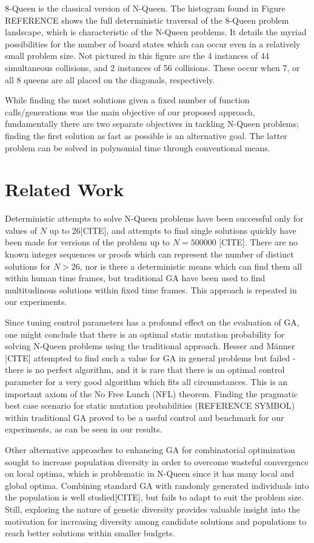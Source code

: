 \documentclass[conference]{IEEEtran}
\begin{document}
8-Queen is the classical version of N-Queen. The histogram found in Figure {REFERENCE} shows the full deterministic traversal of the 8-Queen problem landscape, which is characteristic of the N-Queen problems. It details the myriad possibilities for the number of board states which can occur even in a relatively small problem size. Not pictured in this figure are the 4 instances of 44 simultaneous collisions, and 2 instances of 56 collisions. These occur when 7, or all 8 queens are all placed on the diagonals, respectively. 

While finding the most solutions given a fixed number of function calls/generations was the main objective of our proposed approach, fundamentally there are two separate objectives in tackling N-Queen problems; finding the first solution as fast as possible is an alternative goal. The latter problem can be solved in polynomial time through conventional means.

\section{Related Work}
Deterministic attempts to solve N-Queen problems have been successful only for values of $N$ up to 26[CITE], and attempts to find single solutions quickly have been made for versions of the problem up to {$N = 500000$} [CITE]. There are no known integer sequences or proofs which can represent the number of distinct solutions for $N > 26$, nor is there a deterministic means which can find them all within human time frames, but traditional GA have been used to find multitudinous solutions within fixed time frames. This approach is repeated in our experiments.

Since tuning control parameters has a profound effect on the evaluation of GA, one might conclude that there is an optimal static mutation probability for solving N-Queen problems using the traditional approach. Hesser and M\"{a}nner [CITE] attempted to find such a value for GA in general problems but failed - there is no perfect algorithm, and it is rare that there is an optimal control parameter for a very good algorithm which fits all circumstances. This is an important axiom of the No Free Lunch (NFL) theorem. Finding the pragmatic best case scenario for static mutation probabilities ({REFERENCE SYMBOL}) within traditional GA proved to be a useful control and benchmark for our experiments, as can be seen in our results.

Other alternative approaches to enhancing GA for combinatorial optimization sought to increase population diversity in order to overcome wasteful convergence on local optima, which is problematic in N-Queen since it has many local and global optima. Combining standard GA with randomly generated individuals into the population is well studied[CITE], but fails to adapt to suit the problem size. Still, exploring the nature of genetic diversity provides valuable insight into the motivation for increasing diversity among candidate solutions and populations to reach better solutions within smaller budgets.
\end{document}
